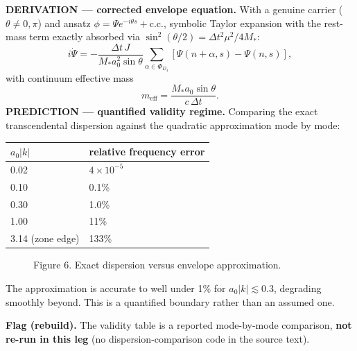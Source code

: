 \documentclass[11pt,a4paper]{article}
\newcommand{\flagbox}[1]{\par\smallskip\noindent\textbf{Flag (rebuild).} #1\par\smallskip}
\begin{document}
\textbf{DERIVATION --- corrected envelope equation.} With a genuine carrier ($\theta \neq 0, \pi$) and ansatz $\phi = \Psi e^{-i\theta s} + \mathrm{c.c.}$, symbolic Taylor expansion with the rest-mass term exactly absorbed via $\sin^2(\theta/2) = \Delta t^2\mu^2/4M_*$:
\begin{equation}
i\dot{\Psi} = -\frac{\Delta t\,J}{M_*a_0^2\sin\theta}\sum_{\alpha \in \Phi_{D_4}} \left[\Psi(n+\alpha,s) - \Psi(n,s)\right],
\end{equation}
with continuum effective mass
\begin{equation}
m_{\mathrm{eff}} = \frac{M_*a_0\sin\theta}{c\,\Delta t}.
\end{equation}
\textbf{PREDICTION --- quantified validity regime.} Comparing the exact transcendental dispersion against the quadratic approximation mode by mode:
\begin{center}
\begin{tabular}{ll}
\toprule
$a_0|k|$ & relative frequency error \\
\midrule
0.02 & $4 \times 10^{-5}$ \\
0.10 & 0.1\% \\
0.30 & 1.0\% \\
1.00 & 11\% \\
3.14 (zone edge) & 133\% \\
\bottomrule
\end{tabular}
\end{center}
\begin{figure}[h]
\centering
{}
\caption{Figure 6. Exact dispersion versus envelope approximation.}
\end{figure}
The approximation is accurate to well under 1\% for $a_0|k| \lesssim 0.3$, degrading smoothly beyond. This is a quantified boundary rather than an assumed one.
\flagbox{The validity table is a reported mode-by-mode comparison, \textbf{not re-run in this leg} (no dispersion-comparison code in the source text).}
\end{document}
